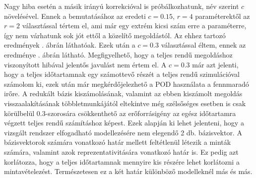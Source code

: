         \par
        Nagy hiba esetén a másik irányú korrekcióval is próbálkozhatunk, név szerint $c$ növelésével. Ennek a bemutatásához az eredeti $c=0.15$, $r=4$ paraméterektől az $r=2$ választással tértem el, ami már egy extrém kicsi szám erre a paraméterre, így nem várhatunk sok jót ettől a közelítő megoldástól. Az ehhez tartozó eredmények . ábrán láthatóak. Ezek után a $c=0.3$ választással éltem, ennek az eredménye . ábrán látható. Megfigyelhető, hogy a teljes rendű megoldáshoz viszonyított hibával jelentős javulást nem értem el. A $c=0.3$ már azt jelenti, hogy a teljes időtartamnak egy számottevő részét a teljes rendű szimulációval számolom ki, ezek után már megkérdőjelezhető a POD használata a fennmaradó irőre. A redukált bázis kiszámolásának, valamint az ebben kiszámolt megoldás visszaalakításának többletmunkájától eltekintve még szélsőséges esetben is csak körülbelül $0.3$-szorosára csökkenthető az erőforrásigény az egész időtartamra végzett teljes rendű számításhoz képest. Ezek alapján ki lehet jelenteni, hogy a vizsgált rendszer elfogadható modellezésére nem elegendő 2 db. bázisvektor. A bázisvektorok számára vonatkozó határ mellett feltétlenül létezik a minták számára, valamint azok reprezentativitására vonatkozó határ is. Ez pedig azt korlátozza, hogy a teljes időtartamnak mennyire kis részére lehet korlátozni a mintavételezést. Természetesen ez a két határ különböző modelleknél más és más. 
